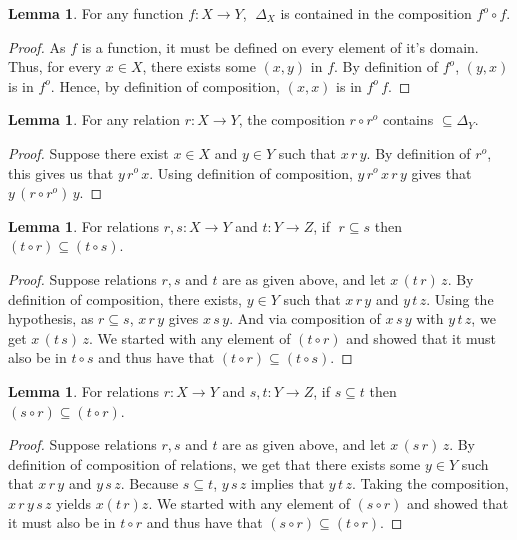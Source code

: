 \documentclass[18pt,a4paper]{article}
\theoremstyle{definition}
\newtheorem{lemma}[theorem]{Lemma}
\begin{document}
\begin{lemma}
	For any function $f:X \to Y$, $\; \Delta_X$ is contained in the composition $ f^o \circ f$.
\end{lemma}
\begin{proof}\setcounter{equation}{0}

	As $f$ is a function, it must be defined on every element of it's domain. Thus, for every
	$x \in X$, there exists some $(x,y)$ in $f$. By definition of $f^o$, $(y,x)$ is in $f^o$.
	Hence, by definition of composition, $(x,x)$ is in $f^o \,f$.
\end{proof}
\begin{lemma}
	For any relation $r:X \to Y$, the composition $r\circ r^o$ contains  $\subseteq \Delta_Y$.
\end{lemma}
\begin{proof}\setcounter{equation}{0}

	Suppose there exist $x \in X$ and $y \in Y$ such that
	$x\,r\,y$. By definition of $r^o$, this
	gives us that $y\, r^o \,x$. Using definition of composition,
	$y\, r^o \,x \,r\,y$ gives that	$y\, (r \circ r^o)\, y$.
\end{proof}
\begin{lemma} For relations $r,s:X\to Y$ and $t:Y\to Z$, if $\;r \subseteq s$ then $(t \circ r) \subseteq (t \circ s)$.
\end{lemma}
\begin{proof}\setcounter{equation}{0}

	Suppose relations $r,s$ and $t$ are as given above, and let $x \,(t \, r)\,z$.
	By definition of composition, there
	exists, $y \in Y$ such that $x\,r\,y$ and $y\,t\,z$.
	Using the hypothesis, as $r \subseteq  s $,
	$x\,r\,y$ gives $x\,s\,y$. And via composition of $x\,s\,y$ with $y \, t \, z $, we get
	$x\,(t\,s)\, z$. We started with any element of $(t \circ r)$ and showed that
	it must also be in $t \circ s$ and thus have that $(t \circ r) \subseteq (t \circ s)$.
\end{proof}
\begin{lemma} For relations $r:X\to Y$ and $s,t:Y\to Z$, if $s\subseteq t$ then
	$(s \circ r) \subseteq (t \circ r)$.
\end{lemma}
\begin{proof}\setcounter{equation}{0}

	Suppose relations $r,s$ and $t$ are as given above, and let  $x \,(s \, r)\,z$.
	By definition of composition of relations, we get that there exists
	some $y \in Y$ such that $x\,r\,y$ and $y\,s\,z$. Because $s \subseteq t$, $y\,s\,z$
	implies that $y\,t\,z$. Taking the composition, $x\,r\,y\,s\,z$ yields $x(t\,r)z$.
	We started with any element of $(s \circ r)$ and showed that it must also be in
	$t \circ r$ and thus have that $(s \circ r) \subseteq (t \circ r)$.
\end{proof}
\end{document}
